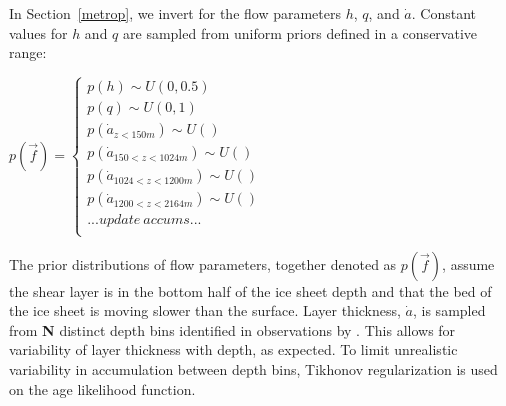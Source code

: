In Section~\ref{metrop}, we invert for the flow parameters $h$, $q$, and $\dot{a}$. Constant values for $h$ and $q$ are sampled from uniform priors defined in a conservative range:

\begin{center}
$p(\vec{f}) = 
	\begin{cases}
		p(h) \sim U(0, 0.5) \\
		p(q) \sim U (0, 1) \\
		p(\dot{a}_{z < 150 m}) \sim U()\\
		p(\dot{a}_{150 < z < 1024 m}) \sim U()\\
		p(\dot{a}_{1024 < z < 1200 m}) \sim U()\\
		p(\dot{a}_{1200 < z < 2164 m}) \sim U()\\
		...update\ accums...\\
	\end{cases}
$	
\end{center}

The prior distributions of flow parameters, together denoted as $p(\vec{f})$, assume the shear layer is in the bottom half of the ice sheet depth and that the bed of the ice sheet is moving slower than the surface. Layer thickness, $\dot{a}$, is sampled from \textbf{N} distinct depth bins identified in observations by \citep{hammer1997}. This allows for variability of layer thickness with depth, as expected. To limit unrealistic variability in accumulation between depth bins, Tikhonov regularization is used on the age likelihood function.
